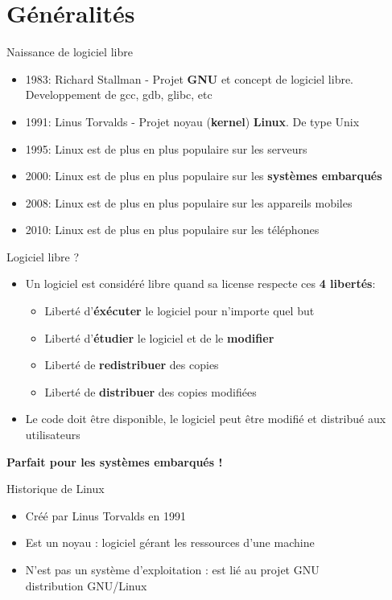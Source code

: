 \section{Généralités}

 \begin{frame}{Naissance de logiciel libre}{}
  \begin{itemize}
  \item 1983: Richard Stallman - Projet \textbf{GNU} et concept de logiciel libre. Developpement de gcc, gdb, glibc, etc
  \item 1991: Linus Torvalds - Projet noyau (\textbf{kernel}) \textbf{Linux}. De type Unix
  \item 1995: Linux est de plus en plus populaire sur les serveurs
  \item 2000: Linux est de plus en plus populaire sur les \textbf{systèmes embarqués}
  \item 2008: Linux est de plus en plus populaire sur les appareils mobiles
  \item 2010: Linux est de plus en plus populaire sur les téléphones
  \end{itemize}
\end{frame}

\begin{frame}{Logiciel libre ?}{}
  \begin{itemize}
  \item Un logiciel est considéré libre quand sa license respecte ces \textbf{4 libertés}:
    \begin{itemize}
    \item Liberté d'\textbf{éxécuter} le logiciel pour n'importe quel but
    \item Liberté d'\textbf{étudier} le logiciel et de le \textbf{modifier}
    \item Liberté de \textbf{redistribuer} des copies
    \item Liberté de \textbf{distribuer} des copies modifiées
    \end{itemize}
  \item Le code doit être disponible, le logiciel peut être modifié et distribué aux utilisateurs
  \end{itemize}
  \center\textbf{Parfait pour les systèmes embarqués !}
\end{frame}

\begin{frame}{Historique de Linux}{}
  \begin{itemize}
  \item Créé par Linus Torvalds en 1991
  \item Est un noyau : logiciel gérant les ressources d'une machine
  \item N'est pas un système d'exploitation : est lié au projet GNU\\
    \MVRightarrow{} distribution GNU/Linux
  \end{itemize}
\end{frame}


